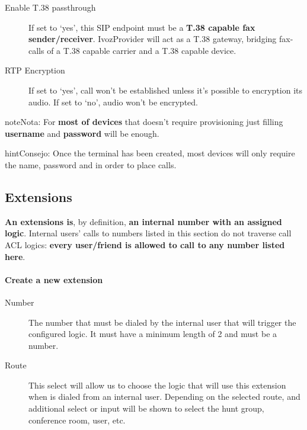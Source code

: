 \documentclass[letterpaper,10pt,spanish]{sphinxmanual}
\begin{document}
\begin{description}
\item[{Enable T.38 passthrough}] \leavevmode{}\label{administration_portal/client/vpbx/terminals:term-enable-t-38-passthrough}
If set to `yes', this SIP endpoint must be a \textbf{T.38 capable fax sender/receiver}. IvozProvider
will act as a T.38 gateway, bridging fax-calls of a T.38 capable carrier and a T.38 capable device.

\item[{RTP Encryption}] \leavevmode{}\label{administration_portal/client/vpbx/terminals:term-rtp-encryption}
If set to `yes', call won't be established unless it's possible to encryption its audio. If set to `no',
audio won't be encrypted.

\end{description}

\begin{notice}{note}{Nota:}
For \textbf{most of devices} that doesn't require provisioning just
filling \textbf{username} and \textbf{password} will be enough.
\end{notice}

\begin{notice}{hint}{Consejo:}
Once the terminal has been created, most devices will only
require the name, password and {\hyperref[getting_started/internal_calls/brand_portal:domain\string-per\string-client]{}}
in order to place calls.
\end{notice}


\subsection{Extensions}
\label{administration_portal/client/vpbx/extensions:extensions}\label{administration_portal/client/vpbx/extensions::doc}
\textbf{An extensions is}, by definition, \textbf{an internal number with an assigned
logic}. Internal users' calls to numbers listed in this section do not traverse
call ACL logics: \textbf{every user/friend is allowed to call to any number listed here}.
\paragraph{Create a new extension}
\begin{description}
\item[{Number}] \leavevmode{}\label{administration_portal/client/vpbx/extensions:term-number}
The number that must be dialed by the internal user that will trigger
the configured logic. It must have a minimum length of 2 and must be
a number.

\item[{Route}] \leavevmode{}\label{administration_portal/client/vpbx/extensions:term-route}
This select will allow us to choose the logic that will use this
extension when is dialed from an internal user. Depending on the selected
route, and additional select or input will be shown to select the
hunt group, conference room, user, etc.

\end{description}
\end{document}

